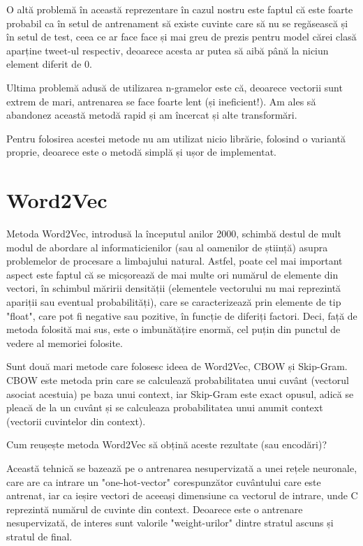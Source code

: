 O altă problemă în această reprezentare în cazul nostru este faptul că este foarte probabil ca în setul 
de antrenament să existe cuvinte care să nu se regăsească și în setul de test, ceea ce ar face face 
și mai greu de prezis pentru model cărei clasă aparține tweet-ul respectiv, deoarece acesta ar putea să aibă
până la niciun element diferit de 0.

Ultima problemă adusă de utilizarea n-gramelor este că, deoarece vectorii sunt extrem de mari, antrenarea se
face foarte lent (și ineficient!). Am ales să abandonez această metodă rapid și am încercat și alte 
transformări.

Pentru folosirea acestei metode nu am utilizat nicio librărie, folosind o variantă proprie,
 deoarece este o metodă simplă și ușor de implementat.


\section{Word2Vec}

Metoda Word2Vec, introdusă la începutul anilor 2000, schimbă destul de mult modul de abordare al
informaticienilor (sau al oamenilor de știință) asupra problemelor de procesare a limbajului natural.
Astfel, poate cel mai important aspect este faptul că se micșorează de mai multe ori numărul
de elemente din vectori, în schimbul măririi densității (elementele vectorului nu mai reprezintă apariții sau eventual probabilități),
care se caracterizează prin elemente de tip "float", care pot fi negative sau pozitive, în funcție 
de diferiți factori. Deci, față de metoda folosită mai sus, este o imbunătățire enormă, cel puțin
din punctul de vedere al memoriei folosite.

Sunt două mari metode care folosesc ideea de Word2Vec, CBOW și Skip-Gram. CBOW este metoda prin care
se calculează probabilitatea unui cuvânt (vectorul asociat acestuia) pe baza unui context, iar Skip-Gram este exact opusul, adică
se pleacă de la un cuvânt și se calculeaza probabilitatea unui anumit context (vectorii cuvintelor din context).

Cum reușește metoda Word2Vec să obțină aceste rezultate (sau encodări)?

Această tehnică se bazează pe o antrenarea nesupervizată a unei rețele neuronale, care are ca intrare
un "one-hot-vector" corespunzător cuvântului care este antrenat, iar ca ieșire vectori de aceeași dimensiune
ca vectorul de intrare, unde C reprezintă numărul de cuvinte din context. Deoarece este o antrenare nesupervizată,
de interes sunt valorile "weight-urilor" dintre stratul ascuns și stratul de final.

